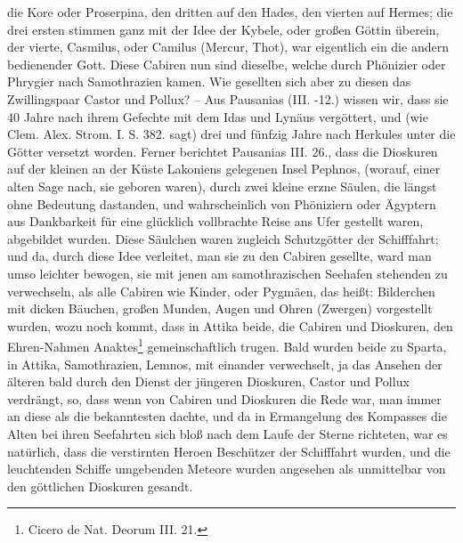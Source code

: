 \documentclass[a4paper, 11pt, oneside, polutonikogreek, german]{article}
\begin{document}
die Kore oder Proserpina, den dritten auf den Hades, den vierten auf Hermes; die drei ersten stimmen ganz mit der Idee der Kybele, oder großen Göttin überein, der vierte, Casmilus, oder Camilus (Mercur, Thot), war eigentlich ein die andern bedienender Gott. Diese Cabiren nun sind dieselbe, welche durch Phönizier oder Phrygier nach Samothrazien kamen. Wie gesellten sich aber zu diesen das Zwillingspaar Castor und Pollux? -- Aus Pausanias (III. -12.) wissen wir, dass sie 40 Jahre nach ihrem Gefechte mit dem Idas und Lynäus vergöttert, und (wie Clem. Alex. Strom. I. S. 382. sagt) drei und fünfzig Jahre nach Herkules unter die Götter versetzt worden. Ferner berichtet Pausanias III. 26., dass die Dioskuren auf der kleinen an der Küste Lakoniens gelegenen Insel Pephnos, (worauf, einer alten Sage nach, sie geboren waren), durch zwei kleine erzne Säulen, die längst ohne Bedeutung dastanden, und wahrscheinlich von Phöniziern oder Ägyptern aus Dankbarkeit für eine glücklich vollbrachte Reise ans Ufer gestellt waren, abgebildet wurden. Diese Säulchen waren zugleich Schutzgötter der Schifffahrt; und da, durch diese Idee verleitet, man sie zu den Cabiren gesellte, ward man umso leichter bewogen, sie mit jenen am samothrazischen Seehafen stehenden zu verwechseln, als alle Cabiren wie Kinder, oder Pygmäen, das heißt: Bilderchen mit dicken Bäuchen, großen Munden, Augen und Ohren (Zwergen) vorgestellt wurden, wozu noch kommt, dass in Attika beide, die Cabiren und Dioskuren, den Ehren-Nahmen Anaktes\footnote{Cicero de Nat. Deorum III. 21.} gemeinschaftlich trugen. Bald wurden beide zu Sparta, in Attika, Samothrazien, Lemnos, mit einander verwechselt, ja das Ansehen der älteren bald durch den Dienst der jüngeren Dioskuren, Castor und Pollux verdrängt, so, dass wenn von Cabiren und Dioskuren die Rede war, man immer an diese als die bekanntesten dachte, und da in Ermangelung des Kompasses die Alten bei ihren Seefahrten sich bloß nach dem Laufe der Sterne richteten, war es natürlich, dass die verstirnten Heroen Beschützer der Schifffahrt wurden, und die leuchtenden Schiffe umgebenden Meteore wurden angesehen als unmittelbar von den göttlichen Dioskuren gesandt.
\end{document}
